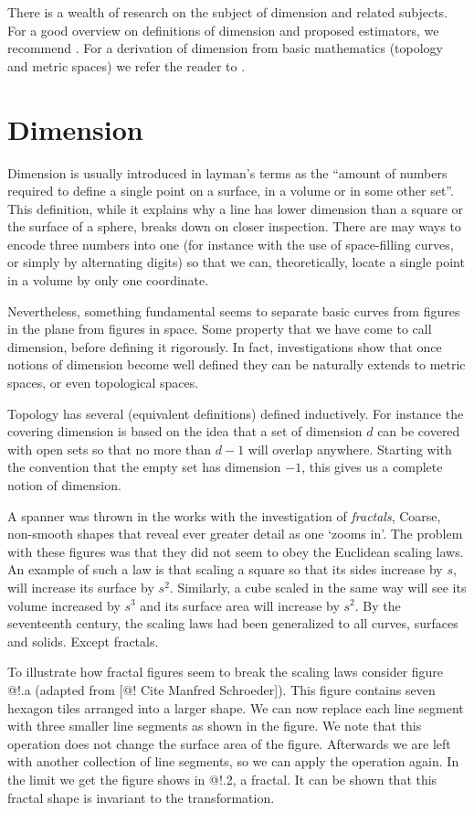 \documentclass[10pt]{article}
\begin{document}
There is a wealth of research on the subject of dimension and related subjects. For a good overview on definitions of dimension and proposed estimators, we recommend \cite{theiler1990estimating}. For a derivation of dimension from basic mathematics (topology and metric spaces) we refer the reader to \cite{edgar2008measure}.

\section{Dimension}

Dimension is usually introduced in layman's terms as the ``amount of numbers required to define a single point on a surface, in a volume or in some other set''. This definition, while it explains why a line has lower dimension than a square or the surface of a sphere, breaks down on closer inspection. There are may ways to encode three numbers into one (for instance with the use of space-filling curves, or simply by alternating digits) so that we can, theoretically, locate a single point in a volume by only one coordinate. 

Nevertheless, something fundamental seems to separate basic curves from figures in the plane from figures in space. Some property that we have come to call dimension, before defining it rigorously. In fact, investigations show that once notions of dimension become well defined they can be naturally extends to metric spaces, or even topological spaces. 

Topology has several (equivalent definitions) defined inductively. For instance the covering dimension is based on the idea that a set of dimension $d$ can be covered with open sets so that no more than $d-1$ will overlap anywhere. Starting with the convention that the empty set has dimension $-1$, this gives us a complete notion of dimension.

A spanner was thrown in the works with the investigation of \textit{fractals}, Coarse, non-smooth shapes that reveal ever greater detail as one `zooms in'. The problem with these figures was that they did not seem to obey the Euclidean scaling laws. An example of such a law is that scaling a square so that its sides increase by $s$, will increase its surface by $s^2$. Similarly, a cube scaled in the same way will see its volume increased by $s^3$ and its surface area will increase by $s^2$. By the seventeenth century, the scaling laws had been generalized to all curves, surfaces and solids. Except fractals.

To illustrate how fractal figures seem to break the scaling laws consider figure @!.a (adapted from [@! Cite Manfred Schroeder]). This figure contains seven hexagon tiles arranged into a larger shape. We can now replace each line segment with three smaller line segments as shown in the figure. We note that this operation does not change the surface area of the figure. Afterwards we are left with another collection of line segments, so we can apply the operation again. In the limit we get the figure shows in @!.2, a fractal. It can be shown that this fractal shape is invariant to the transformation.
\end{document}
